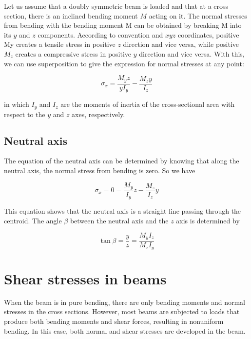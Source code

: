 \documentclass[
10pt,
a4paper,
openany,
svgnames,
]{book} %
\begin{document}
Let us assume that a doubly symmetric beam is loaded and that at a cross section, there is an inclined bending moment $M$ acting on it. The normal stresses from bending with the bending moment M can be obtained by breaking M into its $y$ and $z$ components. According to convention and $xyz$ coordinates, positive My creates a tensile stress in positive $z$ direction and vice versa, while positive $M_z$ creates a compressive stress in positive $y$ direction and vice versa. With this, we can use superposition to give the expression for normal stresses at any point:

\begin{equation}
  \sigma_x = \frac{M_yz}{yI_y} - \frac{M_zy}{I_z}
\end{equation}

in which $I_y$ and $I_z$ are the moments of inertia of the cross-sectional area with respect to the $y$ and $z$ axes, respectively.

\subsection{Neutral axis}

The equation of the neutral axis can be determined by knowing that along the neutral axis, the normal stress from bending is zero. So we have

\begin{equation}
  \sigma_x = 0 = \frac{M_y}{I_y}z - \frac{M_z}{I_z}y
\end{equation}

This equation shows that the neutral axis is a straight line passing through the centroid. The angle $\beta$ between the neutral axis and the $z$ axis is determined by

\begin{equation}
  \tan \beta  = \frac{y}{z} = \frac{M_yI_z}{M_zI_y}
\end{equation}

\section{Shear stresses in beams}

When the beam is in pure bending, there are only bending moments and normal stresses in the cross sections. However, most beams are subjected to loads that produce both bending moments and shear forces, resulting in nonuniform bending. In this case, both normal and shear stresses are developed in the beam.
\end{document}
